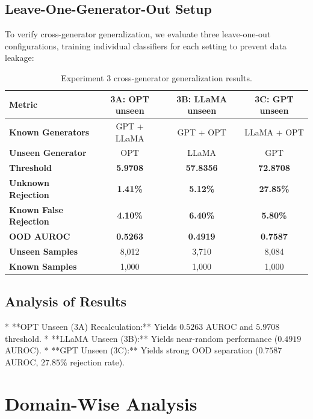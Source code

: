 \documentclass[12pt,a4paper]{report}
\begin{document}
\section{Leave-One-Generator-Out Setup}
To verify cross-generator generalization, we evaluate three leave-one-out configurations, training individual classifiers for each setting to prevent data leakage:
\begin{table}[h]
\footnotesize
\centering
\begin{tabular}{lccc}
\toprule
\textbf{Metric} & \textbf{3A: OPT unseen} & \textbf{3B: LLaMA unseen} & \textbf{3C: GPT unseen} \\
\midrule
\textbf{Known Generators} & GPT + LLaMA & GPT + OPT & LLaMA + OPT \\
\textbf{Unseen Generator} & OPT & LLaMA & GPT \\
\textbf{Threshold} & \textbf{5.9708} & \textbf{57.8356} & \textbf{72.8708} \\
\textbf{Unknown Rejection} & \textbf{1.41\%} & \textbf{5.12\%} & \textbf{27.85\%} \\
\textbf{Known False Rejection} & \textbf{4.10\%} & \textbf{6.40\%} & \textbf{5.80\%} \\
\textbf{OOD AUROC} & \textbf{0.5263} & \textbf{0.4919} & \textbf{0.7587} \\
\textbf{Unseen Samples} & 8,012 & 3,710 & 8,084 \\
\textbf{Known Samples} & 1,000 & 1,000 & 1,000 \\
\bottomrule
\end{tabular}
\caption{Experiment 3 cross-generator generalization results.}
\label{tab:exp3_results}
\end{table}

\section{Analysis of Results}
*   **OPT Unseen (3A) Recalculation:** Yields $0.5263$ AUROC and $5.9708$ threshold.
*   **LLaMA Unseen (3B):** Yields near-random performance ($0.4919$ AUROC).
*   **GPT Unseen (3C):** Yields strong OOD separation ($0.7587$ AUROC, $27.85\%$ rejection rate).

\chapter{Domain-Wise Analysis}
\label{ch:domains}
\end{document}
